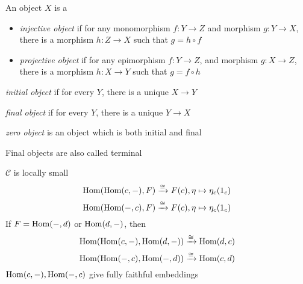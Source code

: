 \documentclass[main]{subfiles}
\begin{document}
\begin{definition}
An object $X$ is a
\begin{itemize}
\item \textit{injective object} if for any monomorphism $f:Y\to Z$ and morphism $g:Y\to X$, there is a morphism $h:Z\to X$ such that $g=h\circ f$
\begin{center}
\end{center}
\item \textit{projective object} if for any epimorphism $f:Y\to Z$, and morphism $g:X\to Z$, there is a morphism $h:X\to Y$ such that $g=f\circ h$
\begin{center}
\end{center}
\end{itemize}
\item \textit{initial object} if for every $Y$, there is a unique $X\to Y$
\item \textit{final object} if for every $Y$, there is a unique $Y\to X$
\item \textit{zero object} is an object which is both initial and final
\end{definition}

\begin{remark}
Final objects are also called terminal
\end{remark}

\begin{lemma}\label{Yoneda lemma}
$\mathscr C$ is locally small
\[\operatorname{Hom}(\operatorname{Hom}(c,-),F)\xrightarrow{\cong} F(c), \eta\mapsto\eta_c(1_c)\]
\[\operatorname{Hom}(\operatorname{Hom}(-,c),F)\xrightarrow{\cong} F(c), \eta\mapsto\eta_c(1_c)\]
If $F=\operatorname{Hom}(-,d)$ or $\operatorname{Hom}(d,-)$, then
\[\operatorname{Hom}(\operatorname{Hom}(c,-),\operatorname{Hom}(d,-))\xrightarrow{\cong}\operatorname{Hom}(d,c)\]
\[\operatorname{Hom}(\operatorname{Hom}(-,c),\operatorname{Hom}(-,d))\xrightarrow{\cong}\operatorname{Hom}(c,d)\]
$\operatorname{Hom}(c,-), \operatorname{Hom}(-,c)$ give fully faithful embeddings
\end{lemma}
\end{document}
